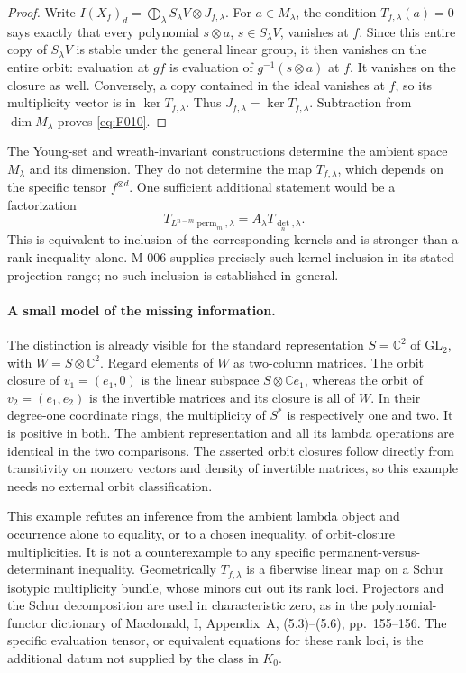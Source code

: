 \begin{proof}
Write
\(I(X_f)_d=\bigoplus_\lambda S_\lambda V\otimes J_{f,\lambda}\).
For \(a\in M_\lambda\), the condition
\(T_{f,\lambda}(a)=0\) says exactly that every polynomial
\(s\otimes a\), \(s\in S_\lambda V\), vanishes at \(f\).
Since this entire copy of \(S_\lambda V\) is stable under the
general linear group, it then vanishes on the entire orbit:
evaluation at \(g f\) is evaluation of \(g^{-1}(s\otimes a)\)
at \(f\).  It vanishes on the closure as well.
Conversely, a copy contained in the ideal vanishes at \(f\),
so its multiplicity vector is in \(\ker T_{f,\lambda}\).
Thus \(J_{f,\lambda}=\ker T_{f,\lambda}\).  Subtraction from
\(\dim M_\lambda\) proves \eqref{eq:F010}.
\end{proof}

The Young-set and wreath-invariant constructions determine the
ambient space \(M_\lambda\) and its dimension.  They do not
determine the map \(T_{f,\lambda}\), which depends on the
specific tensor \(f^{\otimes d}\).  One sufficient additional
statement would be a factorization
\[
 T_{L^{n-m}\operatorname{perm}_m,\lambda}
                   =A_\lambda T_{\det_n,\lambda}.
\]
This is equivalent to inclusion of the corresponding kernels
and is stronger than a rank inequality alone.  M-006 supplies
precisely such kernel inclusion in its stated projection range;
no such inclusion is established in general.

\paragraph{A small model of the missing information.}
The distinction is already visible for the standard representation
\(S=\mathbb C^2\) of \(\mathrm{GL}_2\), with
\(W=S\otimes\mathbb C^2\).  Regard elements of \(W\) as
two-column matrices.  The orbit closure of
\(v_1=(e_1,0)\) is the linear subspace \(S\otimes\mathbb C e_1\),
whereas the orbit of \(v_2=(e_1,e_2)\) is the invertible matrices
and its closure is all of \(W\).  In their degree-one coordinate
rings, the multiplicity of \(S^*\) is respectively one and two.
It is positive in both.  The ambient representation and all its
lambda operations are identical in the two comparisons.
The asserted orbit closures follow directly from transitivity
on nonzero vectors and density of invertible matrices, so this
example needs no external orbit classification.

This example refutes an inference from the ambient lambda object
and occurrence alone to equality, or to a chosen inequality, of
orbit-closure multiplicities.  It is not a counterexample to any
specific permanent-versus-determinant inequality.
Geometrically \(T_{f,\lambda}\) is a fiberwise linear map on a
Schur isotypic multiplicity bundle, whose minors cut out its
rank loci.  Projectors and the Schur decomposition are used in
characteristic zero, as in the polynomial-functor dictionary of
Macdonald, I, Appendix~A, (5.3)--(5.6), pp.~155--156.
The specific evaluation tensor, or equivalent equations for
these rank loci, is the additional datum not supplied by the
class in \(K_0\).

